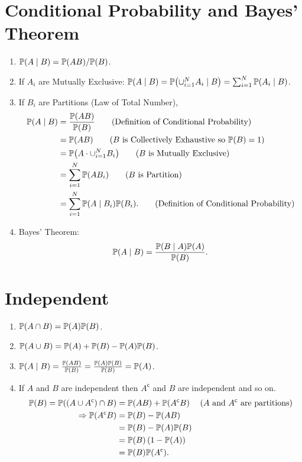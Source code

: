 \section{Conditional Probability and Bayes' Theorem}
\begin{enumerate}
    \item $\condP{A}{B} = \P{AB}/\P{B}$.
    \item If $A_i$ are Mutually Exclusive: $\condP{A}{B} = \condP{\cup_{i=1}^{N}A_i}{B} = \sum_{i=1}^{N}\condP{A_i}{B}$.
    \item If $B_i$ are Partitions (Law of Total Number),
    \begin{align}
        \condP{A}{B}
        &= \frac{\P{AB}}{\P{B}}  \tag{Definition of Conditional Probability}\\
        &= \P{AB}  \tag{$B$ is Collectively Exhaustive so $\P{B}=1$} \\
        &= \P{A\cdot\cup_{i=1}^{N}B_i}  \tag{$B$ is Mutually Exclusive} \\
        &= \sum_{i=1}^{N}\P{AB_i}  \tag{$B$ is Partition} \\
        &= \sum_{i=1}^{N}\condP{A}{B_i}\P{B_i}. \tag{Definition of Conditional Probability}
    \end{align}
\item Bayes' Theorem:{
    \begin{equation*}
        \condP{A}{B} = \frac{\condP{B}{A}\P{A}}{\P{B}}.
    \end{equation*}
}
\end{enumerate}
\section{Independent}
    \begin{enumerate}
        \item $\P{A\cap B}=\P{A}\P{B}$.
        \item $\P{A \cup B} = \P{A}+\P{B}-\P{A}\P{B}$.
        \item $\condP{A}{B} = \frac{\P{AB}}{\P{B}}=\frac{\P{A}\P{B}}{\P{B}}=\P{A}$.
        \item If $A$ and $B$ are independent then $A^{\mathsf{c}}$ and $B$ are independent and so on.{
            \begin{align*}
                \P{B} = \P{(A\cup A^{\mathsf{c}})\cap B}
                &= \P{AB}+\P{A^{\mathsf{c}}B} && \text{($A$ and $A^\mathsf{c}$ are partitions)}\\
                \Rightarrow \P{A^{\mathsf{c}}B}
                &= \P{B}-\P{AB} \\
                &= \P{B}-\P{A}\P{B} \\
                &= \P{B}\left(1-\P{A}\right) \\
                &= \P{B}\P{A^{\mathsf{c}}}.
            \end{align*}
        }
    \end{enumerate}